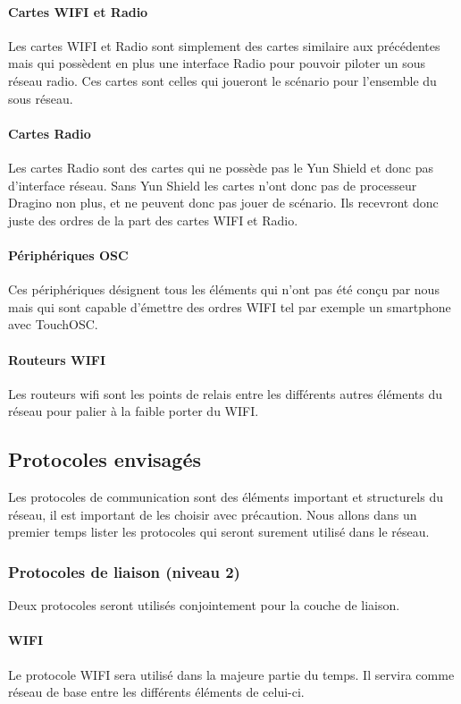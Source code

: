\paragraph{Cartes WIFI et Radio}\p
Les cartes WIFI et Radio sont simplement des cartes similaire aux précédentes mais qui possèdent en plus une interface Radio pour pouvoir piloter un sous réseau radio. Ces cartes sont celles qui joueront le scénario pour l'ensemble du sous réseau.
\paragraph{Cartes Radio}\p
Les cartes Radio sont des cartes qui ne possède pas le Yun Shield et donc pas d'interface réseau. Sans Yun Shield les cartes n'ont donc pas de processeur Dragino non plus, et ne peuvent donc pas jouer de scénario. Ils recevront donc juste des ordres de la part des cartes WIFI et Radio.
\paragraph{Périphériques OSC}\p
Ces périphériques désignent tous les éléments qui n'ont pas été conçu par nous mais qui sont capable d'émettre des ordres WIFI tel par exemple un smartphone avec TouchOSC.
\paragraph{Routeurs WIFI}\p
Les routeurs wifi sont les points de relais entre les différents autres éléments du réseau pour palier à la faible porter du WIFI.

\subsection{Protocoles envisagés}

Les protocoles de communication sont des éléments important et structurels du réseau, il est important de les choisir avec précaution. Nous allons dans un premier temps lister les protocoles qui seront surement utilisé dans le réseau.

\subsubsection{Protocoles de liaison (niveau 2)}
Deux protocoles seront utilisés conjointement pour la couche de liaison.
\paragraph{WIFI}\rt Le protocole WIFI sera utilisé dans la majeure partie du temps. Il servira comme réseau de base entre les différents éléments de celui-ci.
